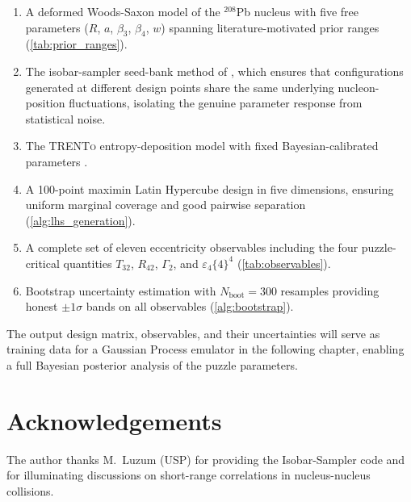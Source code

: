 \documentclass[12pt,a4paper,twoside]{report}
\newcommand{\trento}{\textsc{TRENTo}\xspace}
\begin{document}
\begin{enumerate}[leftmargin=*]
  \item A deformed Woods-Saxon model of the $^{208}$Pb nucleus with
        five free parameters ($R$, $a$, $\beta_3$, $\beta_4$, $w$)
        spanning literature-motivated prior ranges
        (\cref{tab:prior_ranges}).
  \item The isobar-sampler seed-bank method of \cite{Luzum2023_sampler},
        which ensures that configurations generated at different design
        points share the same underlying nucleon-position fluctuations,
        isolating the genuine parameter response from statistical noise.
  \item The \trento entropy-deposition model \cite{Moreland2015} with
        fixed Bayesian-calibrated parameters \cite{Bernhard2019,Nijs2021}.
  \item A 100-point maximin Latin Hypercube design in five dimensions,
        ensuring uniform marginal coverage and good pairwise separation
        (\cref{alg:lhs_generation}).
  \item A complete set of eleven eccentricity observables including
        the four puzzle-critical quantities $T_{32}$, $R_{42}$,
        $\Gamma_2$, and $\varepsilon_4\{4\}^4$ (\cref{tab:observables}).
  \item Bootstrap uncertainty estimation with $N_\mathrm{boot} = 300$
        resamples providing honest $\pm 1\sigma$ bands on all
        observables (\cref{alg:bootstrap}).
\end{enumerate}

The output design matrix, observables, and their uncertainties will
serve as training data for a Gaussian Process emulator in the
following chapter, enabling a full Bayesian posterior analysis of
the puzzle parameters.

\section*{Acknowledgements}

The author thanks M.~Luzum (USP) for providing the Isobar-Sampler
code and for illuminating discussions on short-range correlations in
nucleus-nucleus collisions.
\end{document}
